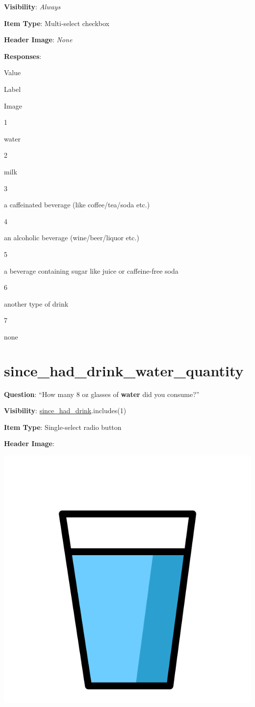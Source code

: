 \documentclass[]{book}
\begin{document}
\textbf{Visibility}: \emph{Always}

\textbf{Item Type}: Multi-select checkbox

\textbf{Header Image}: \emph{None}

\textbf{Responses}:

Value

Label

Image

1

water

2

milk

3

a caffeinated beverage (like coffee/tea/soda etc.)

4

an alcoholic beverage (wine/beer/liquor etc.)

5

a beverage containing sugar like juice or caffeine-free soda

6

another type of drink

7

none

\hypertarget{since_had_drink_water_quantity}{%
\section{since\_had\_drink\_water\_quantity}\label{since_had_drink_water_quantity}}

\textbf{Question}: ``How many 8 oz glasses of \textbf{water} did you consume?''

\textbf{Visibility}: \protect\hyperlink{since_had_drink}{since\_had\_drink}.includes(1)

\textbf{Item Type}: Single-select radio button

\textbf{Header Image}:

\begin{flushleft}\includegraphics[width=0.33\linewidth]{downloadFigs4latex_NIMH_Applet_Codebook/since_had_drink_water_quantity_headerImg} \end{flushleft}
\end{document}
